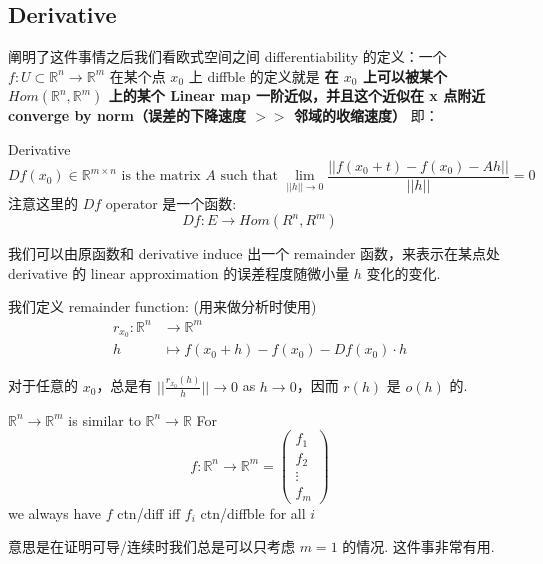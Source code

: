 \documentclass[lang=cn,11pt]{elegantbook}
\begin{document}
\subsection{Derivative}
\noindent 阐明了这件事情之后我们看欧式空间之间 differentiability 的定义：一个 $f: U \subset \mathbb{R}^n \rightarrow \mathbb{R}^m$ 在某个点 $x_0$ 上 diffble 的定义就是 \textbf{在 $x_0$ 上可以被某个 $Hom(\mathbb{R}^n, \mathbb{R}^m)$ 上的某个 Linear map 一阶近似，并且这个近似在 x 点附近 converge by norm（误差的下降速度 $>>$ 邻域的收缩速度）}
即：
\begin{definition}{Derivative} \label{derivartive}
    $$
    Df(x_0) \in \mathbb{R}^{m \times n} \text{ is the matrix } A \text{ such that } \lim_{||h|| \rightarrow 0} \frac{||f(x_0 + t) - f(x_0) - Ah||}{||h||} = 0
    $$
    注意这里的 $Df$ operator 是一个函数:
    $$
    Df : E \rightarrow Hom(R^n, R^m)
    $$
\end{definition}

我们可以由原函数和 derivative induce 出一个 remainder 函数，来表示在某点处 derivative 的 linear approximation 的误差程度随微小量 $h$ 变化的变化. 

\begin{definition}
我们定义 remainder function: (用来做分析时使用)
\begin{align}
    r_{x_0} : \mathbb{R}^n &  \rightarrow \mathbb{R}^m \\
    h & \mapsto f(x_0 + h) - f(x_0) - Df(x_0) \cdot h
\end{align}
\end{definition}

\noindent 对于任意的 $x_0$，总是有 $||\frac{r_{x_0}(h)}{h}|| \rightarrow 0$ as $h \rightarrow 0$，因而 $r(h)$ 是 $o(h)$ 的.

\begin{theorem}{$\mathbb{R}^n \rightarrow \mathbb{R}^m$ is similar to $\mathbb{R}^n \rightarrow \mathbb{R}$} \label{$f$ ctn/diff iff $f_i$ ctn/diffble for all $i$}
    For $$f: \mathbb{R}^n \rightarrow \mathbb{R}^m = \begin{pmatrix}
        f_1 \\ f_2 \\ \vdots \\ f_m
    \end{pmatrix}
    $$ we always have
    $f$ ctn/diff iff $f_i$ ctn/diffble for all $i$
\end{theorem}
意思是在证明可导/连续时我们总是可以只考虑 $m=1$ 的情况. 这件事非常有用.
\end{document}

